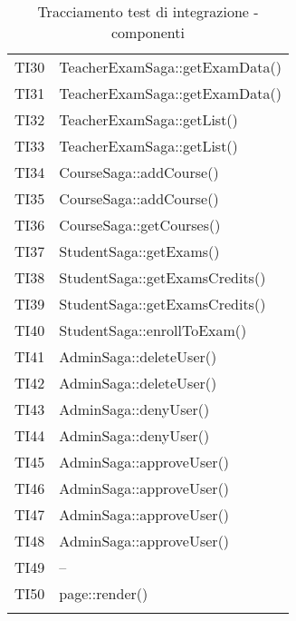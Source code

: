 \documentclass[PianoDiQualifica.tex]{subfiles}
\begin{document}
\begin{longtable}[H]{P{2cm}P{11.5cm}}
	TI30 & TeacherExamSaga::getExamData() \\
	TI31 & TeacherExamSaga::getExamData() \\
	TI32 & TeacherExamSaga::getList() \\
	TI33 & TeacherExamSaga::getList() \\
	TI34 & CourseSaga::addCourse() \\
	TI35 & CourseSaga::addCourse() \\
	TI36 & CourseSaga::getCourses() \\
	TI37 & StudentSaga::getExams() \\
	TI38 & StudentSaga::getExamsCredits() \\
	TI39 & StudentSaga::getExamsCredits() \\
	TI40 & StudentSaga::enrollToExam() \\
	TI41 & AdminSaga::deleteUser() \\
	TI42 & AdminSaga::deleteUser() \\
	TI43 & AdminSaga::denyUser() \\
	TI44 & AdminSaga::denyUser() \\
	TI45 & AdminSaga::approveUser() \\
	TI46 & AdminSaga::approveUser() \\
	TI47 & AdminSaga::approveUser() \\
	TI48 & AdminSaga::approveUser() \\
	TI49 & -- \\
	TI50 & page::render() \\
	\hiderowcolors
	\caption{Tracciamento test di integrazione - componenti}
\end{longtable}
\end{document}
